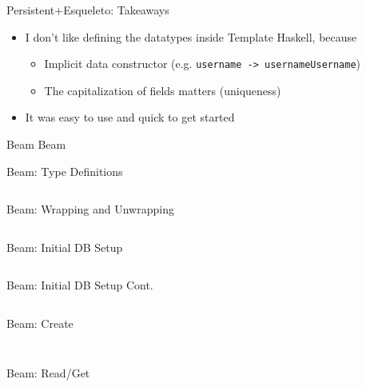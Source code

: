 \documentclass[hyperref={pdfpagelabels=false},12pt]{beamer}
\newcommand{\haskell}[1]{\texttt{#1}}
\newcommand{\pygment}[3]{
  \inputminted[frame=single,framesep=2mm,linenos,fontsize=#1]{#2}{#3}
}
\newcommand{\pygmentLines}[5]{
  \inputminted[frame=single,framesep=2mm,linenos,fontsize=#1,firstline=#2,lastline=#3,autogobble]{#4}{#5}
}
\begin{document}
\begin{frame}{Persistent+Esqueleto: Takeaways}
  \begin{itemize}
    \item I don't like defining the datatypes inside Template Haskell, because
    \begin{itemize}
      \item Implicit data constructor (e.g.
        \haskell{username -> usernameUsername})
      \item The capitalization of fields matters (uniqueness)
    \end{itemize}
    \item It was easy to use and quick to get started
  \end{itemize}
\end{frame}

\begin{frame}{Beam}
  \centering \Huge Beam
\end{frame}

\begin{frame}{Beam: Type Definitions}
  \pygmentLines{\scriptsize}{78}{87}{haskell}{code/beam/src/Person.hs}
\end{frame}

\begin{frame}{Beam: Wrapping and Unwrapping}
  \pygmentLines{\scriptsize}{32}{53}{haskell}{code/beam/src/Person.hs}
\end{frame}

\begin{frame}{Beam: Initial DB Setup}
  \pygmentLines{\scriptsize}{104}{118}{haskell}{code/beam/src/Person.hs}
\end{frame}

\begin{frame}{Beam: Initial DB Setup Cont.}
  \pygmentLines{\scriptsize}{120}{135}{haskell}{code/beam/src/Person.hs}
\end{frame}

\begin{frame}{Beam: Create}
  \pygmentLines{\scriptsize}{146}{148}{haskell}{code/beam/src/Person.hs}
  \pygment{\scriptsize}{sql}{code/sql/insertInto.sql}
\end{frame}

\begin{frame}{Beam: Read/Get}
  \pygmentLines{\scriptsize}{137}{144}{haskell}{code/beam/src/Person.hs}
  \pygment{\scriptsize}{sql}{code/sql/selectWhere.sql}
\end{frame}
\end{document}
